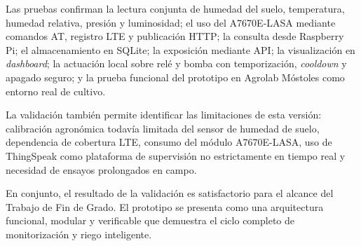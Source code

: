 Las pruebas confirman la lectura conjunta de humedad del suelo, temperatura, humedad relativa, presión y luminosidad; el uso del A7670E-LASA mediante comandos AT, registro LTE y publicación HTTP; la consulta desde Raspberry Pi; el almacenamiento en SQLite; la exposición mediante API; la visualización en \textit{dashboard}; la actuación local sobre relé y bomba con temporización, \textit{cooldown} y apagado seguro; y la prueba funcional del prototipo en Agrolab Móstoles como entorno real de cultivo.

La validación también permite identificar las limitaciones de esta versión: calibración agronómica todavía limitada del sensor de humedad de suelo, dependencia de cobertura LTE, consumo del módulo A7670E-LASA, uso de ThingSpeak como plataforma de supervisión no estrictamente en tiempo real y necesidad de ensayos prolongados en campo.

En conjunto, el resultado de la validación es satisfactorio para el alcance del Trabajo de Fin de Grado. El prototipo se presenta como una arquitectura funcional, modular y verificable que demuestra el ciclo completo de monitorización y riego inteligente.
